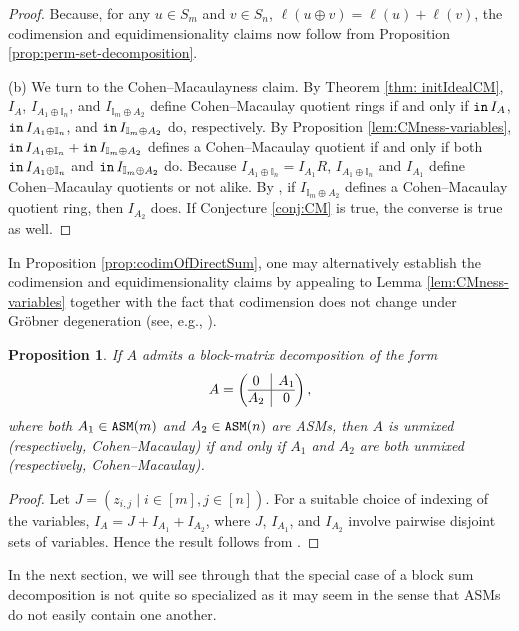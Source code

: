 \documentclass[12 pt]{amsart}
\DeclareMathOperator{\init}{{\tt in}}
\DeclareMathOperator{\asm}{\tt ASM}
\theoremstyle{plain}
\newtheorem{prop}[thm]{Proposition}
\theoremstyle{definition}
\theoremstyle{remark}
\begin{document}
{\begin{proof}
    Because, for any $u \in S_m$ and $v \in S_n$, $\ell(u \oplus v) = \ell(u)+\ell(v)$, the codimension and equidimensionality claims now follow from Proposition \ref{prop:perm-set-decomposition}.
    
    (b) We turn to the Cohen--Macaulayness claim.  By Theorem \ref{thm: initIdealCM}, $I_A$, $I_{A_1 \oplus \mathbb{I}_n}$, and $I_{\mathbb{I}_m\oplus A_2}$ define Cohen--Macaulay quotient rings if and only if $\init I_A$,  $\init I_{A_1 \oplus \mathbb{I}_n}$, and $\init I_{\mathbb{I}_m\oplus A_2}$ do, respectively.  By Proposition \ref{lem:CMness-variables}, $\init I_{A_1 \oplus \mathbb{I}_n}+\init I_{\mathbb{I}_m\oplus A_2}$ defines a Cohen--Macaulay quotient if and only if both $\init I_{A_1 \oplus \mathbb{I}_n}$ and $\init I_{\mathbb{I}_m\oplus A_2}$ do.  Because $I_{A_1 \oplus \mathbb{I}_n} = I_{A_1}R$, $I_{A_1 \oplus \mathbb{I}_n}$ and $I_{A_1}$ define Cohen--Macaulay quotients or not alike.  By , if $I_{\mathbb{I}_m\oplus A_2}$ defines a Cohen--Macaulay quotient ring, then $I_{A_2}$ does.  If Conjecture \ref{conj:CM} is true, the converse is true as well.
\end{proof}

In Proposition \ref{prop:codimOfDirectSum}, one may alternatively establish the codimension and equidimensionality claims by appealing to Lemma \ref{lem:CMness-variables} together with the fact that codimension does not change under Gr\"obner degeneration (see, e.g., \cite[Chapter 15]{Eis95}).

\begin{prop}
    If $A$ admits a block-matrix decomposition of the form
\[A = \left(\begin{array}{@{}c|c@{}}
0 & A_1\\\hline
A_2 & 0\\
  \end{array}\right),
\]
where both $A_1 \in \asm(m)$ and $A_2 \in \asm(n)$ are ASMs, then $A$ is unmixed (respectively, Cohen--Macaulay) if and only if $A_1$ and $A_2$ are both unmixed (respectively, Cohen--Macaulay).
\end{prop} 
\begin{proof}
    Let $J = (z_{i,j} \mid i \in [m], j \in [n])$.  For a suitable choice of indexing of the variables, $I_A = J+I_{A_1}+I_{A_2}$, where $J$, $I_{A_1}$, and $I_{A_2}$ involve pairwise disjoint sets of variables.  Hence the result follows from .
\end{proof}

In the next section, we will see through  that the special case of a block sum decomposition is not quite so specialized as it may seem in the sense that ASMs do not easily contain one another.



}
\end{document}
